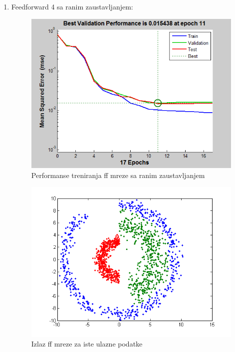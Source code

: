\documentclass{report}
\begin{document}
\begin{enumerate}
\begin{enumerate}
\newpage
\item\LARGE
Feedforward 4 sa ranim zaustavljanjem:\large

\begin{figure}[!h]
\begin{center}
\includegraphics[scale=0.8]{B1performanceFF4early.png}
\caption{Performanse treniranja ff mreze sa ranim zaustavljanjem}
\end{center}
\end{figure}

\begin{figure}[!h]
\begin{center}
\includegraphics[scale=0.8]{B1outputFF4earlySame.png}
\caption{Izlaz ff mreze za iste ulazne podatke}
\end{center}
\end{figure}


\end{enumerate}
\end{enumerate}
\end{document}
